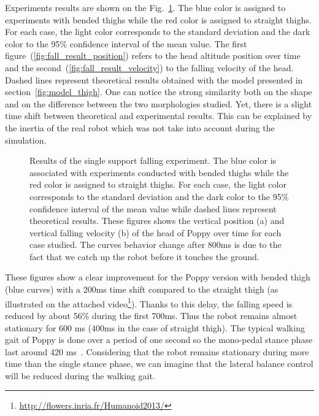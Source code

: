 Experiments results are shown on the Fig.~\ref{fig:falling_results}. The blue color is assigned to experiments with bended thighs while the red color is assigned to straight thighs. For each case, the light color corresponds to the standard deviation and the dark color to the 95\% confidence interval of the mean value.
The first figure~(\ref{fig:fall_result_position}) refers to the head altitude position over time
and the second~(\ref{fig:fall_result_velocity}) to the falling velocity of the head. Dashed lines represent theoretical results obtained with the model presented in section~\ref{fig:model_thigh}. One can notice the strong similarity both on the shape and on the difference between the two morphologies studied. Yet, there is a slight time shift between theoretical and experimental results. This can be explained by the inertia of the real robot which was not take into account during the simulation.

\begin{figure}[h]
\centering
    \hfil
    \caption{Results of the single support falling experiment. The blue color is associated with experiments conducted with bended thighs while the red color is assigned to straight thighs. For each case, the light color corresponds to the standard deviation and the dark color to the 95\% confidence interval of the mean value while dashed lines represent theoretical results. These figures shows the vertical position (a) and vertical falling velocity (b) of the head of Poppy over time for each case studied. The curves behavior change after 800ms is due to the fact that we catch up the robot before it touches the ground.}
    \label{fig:falling_results}
\end{figure}

These figures show a clear improvement for the Poppy version with bended thigh (blue curves) with a 200ms time shift compared to the straight thigh (as illustrated on the attached video\footnote{\url{http://flowers.inria.fr/Humanoid2013/}\label{video}}). Thanks to this delay, the falling speed is reduced by about 56\% during the first 700ms. Thus the robot remains almost stationary for 600 ms (400ms in the case of straight thigh). The typical walking gait of Poppy is done over a period of one second so the mono-pedal stance phase last around 420 ms~\cite{lapeyre2013poppy}. Considering that the robot remains stationary during more time than the single stance phase, we can imagine that the lateral balance control will be reduced during the walking gait.

